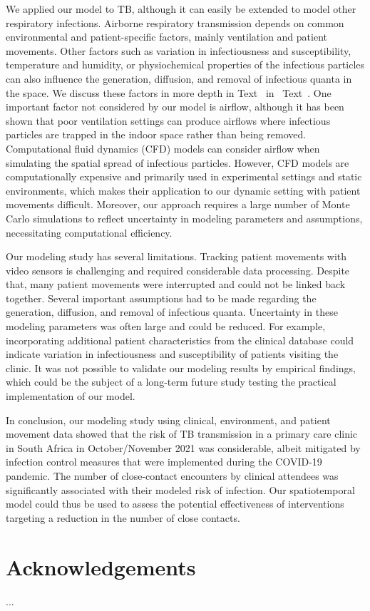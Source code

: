 \documentclass[fleqn,11pt]{wlscirep}
\begin{document}
We applied our model to TB, although it can easily be extended to model other respiratory infections. Airborne respiratory transmission depends on common environmental and patient-specific factors, mainly ventilation and patient movements. Other factors such as variation in infectiousness and susceptibility, temperature and humidity, or physiochemical properties of the infectious particles can also influence the generation, diffusion, and removal of infectious quanta in the space\cite{Wang2021Science}. We discuss these factors in more depth in \supp Text~ in \supp~Text~. One important factor not considered by our model is airflow, although it has been shown that poor ventilation settings can produce airflows where infectious particles are trapped in the indoor space rather than being removed\cite{Li2021BuildEnv}. Computational fluid dynamics (CFD) models can consider airflow when simulating the spatial spread of infectious particles\cite{Vuorinen2020SafSci,Jung2021InfectChemo,Li2021BuildEnv,Yan2023BE,Qian2009BE,Li2022SOTTE}. However, CFD models are computationally expensive and primarily used in experimental settings and static environments, which makes their application to our dynamic setting with patient movements difficult. Moreover, our approach requires a large number of Monte Carlo simulations to reflect uncertainty in modeling parameters and assumptions, necessitating computational efficiency. 

Our modeling study has several limitations. Tracking patient movements with video sensors is challenging and required considerable data processing. Despite that, many patient movements were interrupted and could not be linked back together. Several important assumptions had to be made regarding the generation, diffusion, and removal of infectious quanta. Uncertainty in these modeling parameters was often large and could be reduced. For example, incorporating additional patient characteristics from the clinical database could indicate variation in infectiousness and susceptibility of patients visiting the clinic. It was not possible to validate our modeling results by empirical findings, which could be the subject of a long-term future study testing the practical implementation of our model.


In conclusion, our modeling study using clinical, environment, and patient movement data showed that the risk of TB transmission in a primary care clinic in South Africa in October/November 2021 was considerable, albeit mitigated by infection control measures that were implemented during the COVID-19 pandemic. The number of close-contact encounters by clinical attendees was significantly associated with their modeled risk of infection. Our spatiotemporal model could thus be used to assess the potential effectiveness of interventions targeting a reduction in the number of close contacts. 


\newpage


\section*{Acknowledgements}
...


\end{document}
